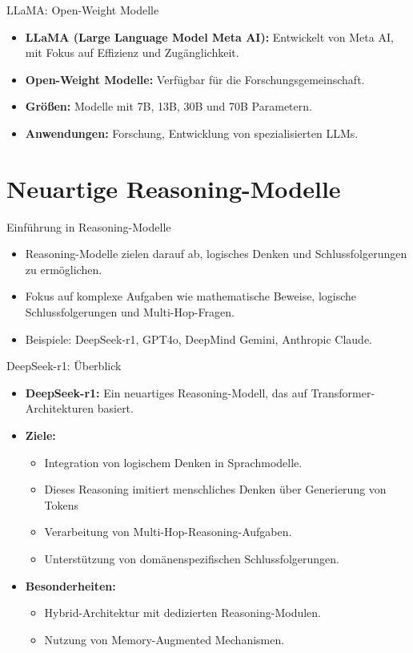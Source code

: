 \documentclass[aspectratio=1610, xcolor=dvipsnames, 9pt]{beamer}
\begin{document}
\begin{frame}{LLaMA: Open-Weight Modelle}
  \begin{itemize}
    \item \textbf{LLaMA (Large Language Model Meta AI):} Entwickelt von Meta AI, mit Fokus auf Effizienz und Zugänglichkeit.
    \item \textbf{Open-Weight Modelle:} Verfügbar für die Forschungsgemeinschaft.
    \item \textbf{Größen:} Modelle mit 7B, 13B, 30B und 70B Parametern.
    \item \textbf{Anwendungen:} Forschung, Entwicklung von spezialisierten LLMs.
  \end{itemize}
\end{frame}

\section{Neuartige Reasoning-Modelle}

\begin{frame}{Einführung in Reasoning-Modelle}
  \begin{itemize}
    \item Reasoning-Modelle zielen darauf ab, logisches Denken und Schlussfolgerungen zu ermöglichen.
    \item Fokus auf komplexe Aufgaben wie mathematische Beweise, logische Schlussfolgerungen und Multi-Hop-Fragen.
    \item Beispiele: DeepSeek-r1, GPT4o, DeepMind Gemini, Anthropic Claude.
  \end{itemize}
\end{frame}

\begin{frame}{DeepSeek-r1: Überblick}
  \begin{itemize}
    \item \textbf{DeepSeek-r1:} Ein neuartiges Reasoning-Modell, das auf Transformer-Architekturen basiert.
    \item \textbf{Ziele:}
      \begin{itemize}
        \item Integration von logischem Denken in Sprachmodelle.
        \item Dieses Reasoning imitiert menschliches Denken über Generierung von Tokens
        \item Verarbeitung von Multi-Hop-Reasoning-Aufgaben.
        \item Unterstützung von domänenspezifischen Schlussfolgerungen.
      \end{itemize}
    \item \textbf{Besonderheiten:}
      \begin{itemize}
        \item Hybrid-Architektur mit dedizierten Reasoning-Modulen.
        \item Nutzung von Memory-Augmented Mechanismen.
      \end{itemize}
  \end{itemize}
\end{frame}
\end{document}
